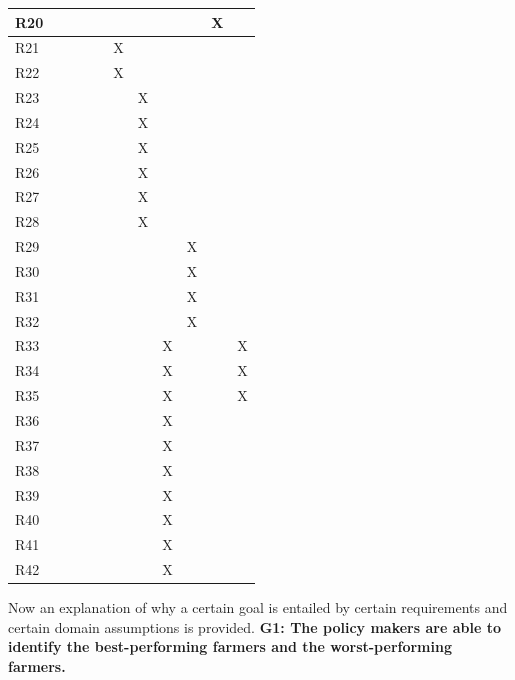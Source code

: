 \documentclass{article}
\begin{document}
\begin{longtable}[c]{|m{0.15cm}|m{0.15cm}|m{0.15cm}|m{0.15cm}|m{0.15cm}|m{0.15cm}|m{0.15cm}|m{0.15cm}|m{0.15cm}|m{0.15cm}|m{0.15cm}|}
 \hline
 R20 &   &   &   &   &   &   &   &   & X &   \\
 \hline
 R21 &   &   &   &   & X &   &   &   &   &   \\
 \hline
 R22 &   &   &   &   & X &   &   &   &   &   \\
 \hline
 R23 &   &   &   &   &   & X &   &   &   &   \\
 \hline
 R24 &   &   &   &   &   & X &   &   &   &   \\
 \hline
 R25 &   &   &   &   &   & X &   &   &   &   \\
 \hline
 R26 &   &   &   &   &   & X &   &   &   &   \\
 \hline
 R27 &   &   &   &   &   & X &   &   &   &   \\
 \hline
 R28 &   &   &   &   &   & X &   &   &   &   \\
 \hline
 R29 &   &   &   &   &   &   &   & X &   &   \\
 \hline
 R30 &   &   &   &   &   &   &   & X &   &   \\
 \hline
 R31 &   &   &   &   &   &   &   & X &   &   \\
 \hline
 R32 &   &   &   &   &   &   &   & X &   &   \\
 \hline
 R33 &   &   &   &   &   &   & X &   &   & X \\
 \hline
 R34 &   &   &   &   &   &   & X &   &   & X \\
 \hline
 R35 &   &   &   &   &   &   & X &   &   & X \\
 \hline
 R36 &   &   &   &   &   &   & X &   &   &   \\
 \hline
 R37 &   &   &   &   &   &   & X &   &   &   \\
 \hline
 R38 &   &   &   &   &   &   & X &   &   &   \\
 \hline
 R39 &   &   &   &   &   &   & X &   &   &   \\
 \hline
 R40 &   &   &   &   &   &   & X &   &   &   \\
 \hline
 R41 &   &   &   &   &   &   & X &   &   &   \\
 \hline
 R42 &   &   &   &   &   &   & X &   &   &   \\
 \hline
\end{longtable}
Now an explanation of why a certain goal is entailed by certain requirements and certain domain assumptions is provided.
\vspace{1cm}
\textbf{G1: The policy makers are able to identify the best-performing farmers and the worst-performing farmers.}
\end{document}
